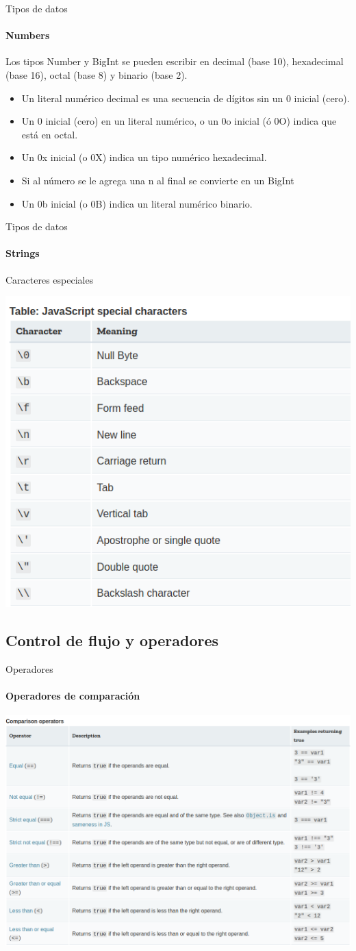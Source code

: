 \documentclass[aspectratio=169]{beamer}
\begin{document}
\begin{darkframes}
    \begin{frame}{Tipos de datos}
      \framesubtitle{Numbers}
      Los tipos Number y BigInt se pueden escribir en decimal (base 10), hexadecimal (base 16), octal (base 8) y binario (base 2).
      \begin{itemize}
        \item Un literal numérico decimal es una secuencia de dígitos sin un 0 inicial (cero).
        \item Un 0 inicial (cero) en un literal numérico, o un 0o inicial (ó 0O) indica que está en octal.
        \item Un 0x inicial (o 0X) indica un tipo numérico hexadecimal.
        \item Si al número se le agrega una n al final se convierte en un BigInt
        \item Un 0b inicial (o 0B) indica un literal numérico binario.
      \end{itemize}
    \end{frame}

    \begin{frame}{Tipos de datos}
      \framesubtitle{Strings}
      Caracteres especiales
      \begin{center}
        \includegraphics[width=.45\textwidth]{caracteres}
      \end{center}
    \end{frame}


    \subsection{Control de flujo y operadores}
    \begin{frame}{Operadores}
      \framesubtitle{Operadores de comparación}
      \begin{center}
        \includegraphics[width=.7\textwidth]{comparacion}
      \end{center}


\end{frame}
\end{darkframes}
\end{document}
